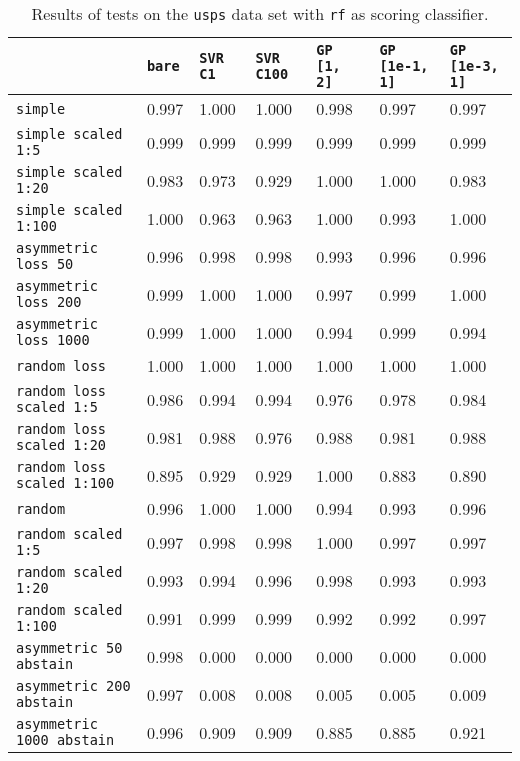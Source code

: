 \begin{table}
{\scriptsize
\begin{tabu}{l|l|l|l|l|l|l}
&\texttt{bare} &\texttt{SVR C1} &\texttt{SVR C100} &\texttt{GP [1, 2]} &\texttt{GP [1e-1, 1]} &\texttt{GP [1e-3, 1]}  \\
\hline
\texttt{simple} &0.997 &1.000 &1.000 &0.998 &0.997 &0.997 \\
\texttt{simple scaled 1:5} &0.999 &0.999 &0.999 &0.999 &0.999 &0.999 \\
\texttt{simple scaled 1:20} &0.983 &0.973 &0.929 &1.000 &1.000 &0.983 \\
\texttt{simple scaled 1:100} &1.000 &0.963 &0.963 &1.000 &0.993 &1.000 \\
\texttt{asymmetric loss 50} &0.996 &0.998 &0.998 &0.993 &0.996 &0.996 \\
\texttt{asymmetric loss 200} &0.999 &1.000 &1.000 &0.997 &0.999 &1.000 \\
\texttt{asymmetric loss 1000} &0.999 &1.000 &1.000 &0.994 &0.999 &0.994 \\
\texttt{random loss} &1.000 &1.000 &1.000 &1.000 &1.000 &1.000 \\
\texttt{random loss scaled 1:5} &0.986 &0.994 &0.994 &0.976 &0.978 &0.984 \\
\texttt{random loss scaled 1:20} &0.981 &0.988 &0.976 &0.988 &0.981 &0.988 \\
\texttt{random loss scaled 1:100} &0.895 &0.929 &0.929 &1.000 &0.883 &0.890 \\
\texttt{random} &0.996 &1.000 &1.000 &0.994 &0.993 &0.996 \\
\texttt{random scaled 1:5} &0.997 &0.998 &0.998 &1.000 &0.997 &0.997 \\
\texttt{random scaled 1:20} &0.993 &0.994 &0.996 &0.998 &0.993 &0.993 \\
\texttt{random scaled 1:100} &0.991 &0.999 &0.999 &0.992 &0.992 &0.997 \\
\texttt{asymmetric 50 abstain} &0.998 &0.000 &0.000 &0.000 &0.000 &0.000 \\
\texttt{asymmetric 200 abstain} &0.997 &0.008 &0.008 &0.005 &0.005 &0.009 \\
\texttt{asymmetric 1000 abstain} &0.996 &0.909 &0.909 &0.885 &0.885 &0.921 \\
\end{tabu} }
\caption{Results of tests on the \texttt{usps} data set
         with \texttt{rf} as scoring classifier.}
\end{table}

